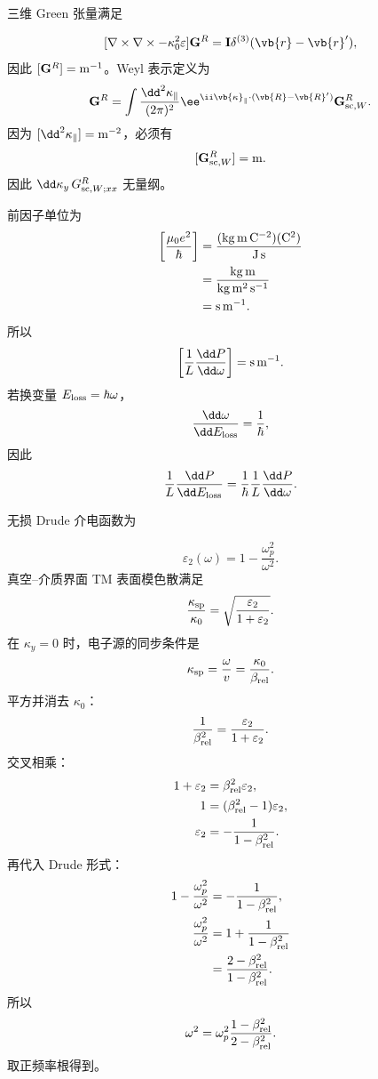 \begin{derivation}
三维 Green 张量满足

\[
[\nabla\times\nabla\times-\kappa_0^2\varepsilon]\mathbf G^R
=\mathbf I\delta^{(3)}(\vb{r}-\vb{r}'),
\]
因此 $[\mathbf G^R]={\rm m^{-1}}$。Weyl 表示定义为
\[
\mathbf G^R
=\int\frac{\dd^2 \kappa_\parallel}{(2\pi)^2}
\ee^{\ii\vb{\kappa}_\parallel\cdot(\vb{R}-\vb{R}')}
\mathbf G_{{\rm sc},W}^R.
\]
因为 $[\dd^2 \kappa_\parallel]={\rm m^{-2}}$，必须有
\[
[\mathbf G_{{\rm sc},W}^R]={\rm m}.
\]
因此 $\dd \kappa_y\,G_{{\rm sc},W;xx}^R$ 无量纲。

前因子单位为
\begin{align*}
\left[\frac{\mu_0e^2}{\hbar}\right]
&=\frac{({\rm kg\,m\,C^{-2}})({\rm C^2})}
{{\rm J\,s}}\\
&=\frac{{\rm kg\,m}}{{\rm kg\,m^2\,s^{-1}}}\\
&={\rm s\,m^{-1}}.
\end{align*}
所以
\[
\left[\frac1L\frac{\dd P}{\dd\omega}\right]
={\rm s\,m^{-1}}.
\]
若换变量 $E_{\rm loss}=\hbar\omega$，
\[
\frac{\dd\omega}{\dd E_{\rm loss}}=\frac1\hbar,
\]
因此
\[
\frac1L\frac{\dd P}{\dd E_{\rm loss}}
=\frac1\hbar\frac1L\frac{\dd P}{\dd\omega}.
\]
\end{derivation}

\begin{derivation}
无损 Drude 介电函数为

\[
\varepsilon_2(\omega)=1-\frac{\omega_p^2}{\omega^2}.
\]
真空--介质界面 TM 表面模色散满足
\[
\frac{\kappa_{\rm sp}}{\kappa_0}
=\sqrt{\frac{\varepsilon_2}{1+\varepsilon_2}}.
\]
在 $\kappa_y=0$ 时，电子源的同步条件是
\[
\kappa_{\rm sp}=\frac{\omega}{v}
=\frac{\kappa_0}{\beta_{\rm rel}}.
\]
平方并消去 $\kappa_0$：
\[
\frac1{\beta_{\rm rel}^2}
=\frac{\varepsilon_2}{1+\varepsilon_2}.
\]
交叉相乘：
\begin{align*}
1+\varepsilon_2
&=\beta_{\rm rel}^2\varepsilon_2,\\
1
&=(\beta_{\rm rel}^2-1)\varepsilon_2,\\
\varepsilon_2
&=-\frac1{1-\beta_{\rm rel}^2}.
\end{align*}
再代入 Drude 形式：
\begin{align*}
1-\frac{\omega_p^2}{\omega^2}
&=-\frac1{1-\beta_{\rm rel}^2},\\
\frac{\omega_p^2}{\omega^2}
&=1+\frac1{1-\beta_{\rm rel}^2}\\
&=\frac{2-\beta_{\rm rel}^2}{1-\beta_{\rm rel}^2}.
\end{align*}
所以
\[
\omega^2
=\omega_p^2\frac{1-\beta_{\rm rel}^2}{2-\beta_{\rm rel}^2}.
\]
取正频率根得到。
\end{derivation}
